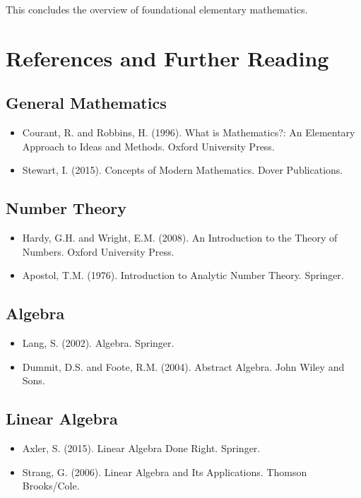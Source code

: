 \documentclass[12pt,a4paper]{article}
\begin{document}
This concludes the overview of foundational elementary mathematics.

\section{References and Further Reading}

\subsection{General Mathematics}

\begin{itemize}
    \item Courant, R. and Robbins, H. (1996). What is Mathematics?: An Elementary Approach to Ideas and Methods. Oxford University Press.
    \item Stewart, I. (2015). Concepts of Modern Mathematics. Dover Publications.
\end{itemize}

\subsection{Number Theory}

\begin{itemize}
    \item Hardy, G.H. and Wright, E.M. (2008). An Introduction to the Theory of Numbers. Oxford University Press.
    \item Apostol, T.M. (1976). Introduction to Analytic Number Theory. Springer.
\end{itemize}

\subsection{Algebra}

\begin{itemize}
    \item Lang, S. (2002). Algebra. Springer.
    \item Dummit, D.S. and Foote, R.M. (2004). Abstract Algebra. John Wiley and Sons.
\end{itemize}

\subsection{Linear Algebra}

\begin{itemize}
    \item Axler, S. (2015). Linear Algebra Done Right. Springer.
    \item Strang, G. (2006). Linear Algebra and Its Applications. Thomson Brooks/Cole.
\end{itemize}
\end{document}
